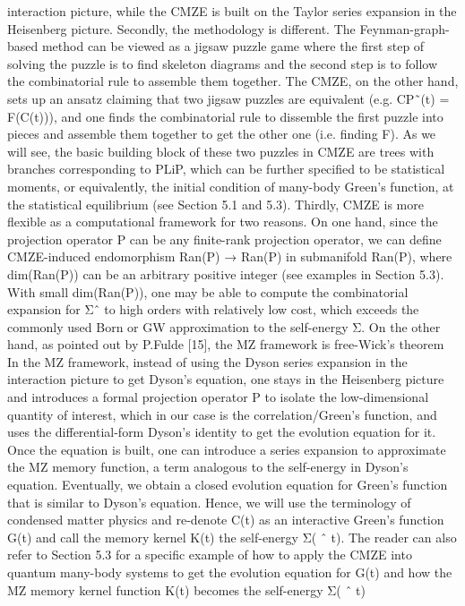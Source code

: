 \documentclass[11pt]{article} %
\begin{document}
interaction picture, while the CMZE is built on the Taylor series expansion in the Heisenberg picture.
Secondly, the methodology is different. The Feynman-graph-based method can be viewed as a jigsaw puzzle
game where the first step of solving the puzzle is to find skeleton diagrams and the second step is to follow the
combinatorial rule to assemble them together. The CMZE, on the other hand, sets up an ansatz claiming
that two jigsaw puzzles are equivalent (e.g. CP˜(t) = F(C(t))), and one finds the combinatorial rule to
dissemble the first puzzle into pieces and assemble them together to get the other one (i.e. finding F). As
we will see, the basic building block of these two puzzles in CMZE are trees with branches corresponding
to PLiP, which can be further specified to be statistical moments, or equivalently, the initial condition of
many-body Green’s function, at the statistical equilibrium (see Section 5.1 and 5.3). Thirdly, CMZE is more
flexible as a computational framework for two reasons. On one hand, since the projection operator P can
be any finite-rank projection operator, we can define CMZE-induced endomorphism Ran(P) → Ran(P) in
submanifold Ran(P), where dim(Ran(P)) can be an arbitrary positive integer (see examples in Section 5.3).
With small dim(Ran(P)), one may be able to compute the combinatorial expansion for Σˆ to high orders
with relatively low cost, which exceeds the commonly used Born or GW approximation to the self-energy Σ.
On the other hand, as pointed out by P.Fulde [15], the MZ framework is free-Wick’s theorem
In the MZ framework, instead of using the Dyson series expansion
in the interaction picture to get Dyson’s equation, one stays in the Heisenberg picture and introduces a
formal projection operator P to isolate the low-dimensional quantity of interest, which in our case is the
correlation/Green’s function, and uses the differential-form Dyson’s identity to get the evolution equation for
it. Once the equation is built, one can introduce a series expansion to approximate the MZ memory function,
a term analogous to the self-energy in Dyson’s equation. Eventually, we obtain a closed evolution equation for
Green’s function that is similar to Dyson’s equation.
Hence, we will use the terminology of condensed matter physics and re-denote C(t) as an
interactive Green’s function G(t) and call the memory kernel K(t) the self-energy Σ( ˆ t). The reader can also
refer to Section 5.3 for a specific example of how to apply the CMZE into quantum many-body systems to get
the evolution equation for G(t) and how the MZ memory kernel function K(t) becomes the self-energy Σ( ˆ t)
\end{document}
